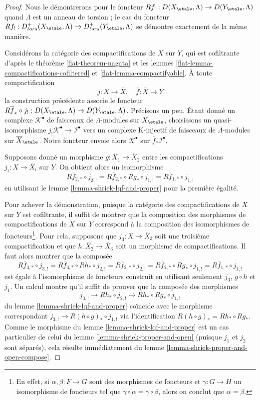 \begin{proof}
Nous le démontrerons pour le foncteur
$Rf_! : D(X_\etale, \Lambda) \to D(Y_\etale, \Lambda)$
quand $\Lambda$ est un anneau de torsion ; le cas du foncteur
$Rf_! : D^+_{tors}(X_\etale, \Lambda) \to D^+_{tors}(Y_\etale, \Lambda)$
se démontre exactement de la même manière.

\medskip\noindent
Considérons la catégorie des compactifications de $X$ sur $Y$, qui est
cofiltrante d'après le théorème \ref{flat-theorem-nagata} et les
lemmes \ref{flat-lemma-compactifications-cofiltered} et
\ref{flat-lemma-compactifyable}.
À toute compactification
$$
j : X \to \overline{X},\quad \overline{f} : \overline{X} \to Y
$$
la construction précédente associe le foncteur $R\overline{f}_* \circ j_! :
D(X_\etale, \Lambda) \to D(Y_\etale, \Lambda)$.
Précisons un peu. Étant donné un complexe $\mathcal{K}^\bullet$
de faisceaux de $\Lambda$-modules sur $X_\etale$, choisissons un quasi-isomorphisme
$j_!\mathcal{K}^\bullet \to \mathcal{I}^\bullet$ vers un complexe K-injectif
de faisceaux de $\Lambda$-modules sur $\overline{X}_\etale$.
Notre foncteur envoie alors $\mathcal{K}^\bullet$ sur
$\overline{f}_*\mathcal{I}^\bullet$.

\medskip\noindent
Supposons donné un morphisme $g : \overline{X}_1 \to \overline{X}_2$
entre les compactifications $j_i : X \to \overline{X}_i$ sur $Y$.
On obtient alors un isomorphisme
$$
R\overline{f}_{2, *} \circ j_{2, !} =
R\overline{f}_{2, *} \circ Rg_* \circ j_{1, !} =
R\overline{f}_{1, *} \circ j_{1, !}
$$
en utilisant le lemme \ref{lemma-shriek-lqf-and-proper} pour la première égalité.

\medskip\noindent
Pour achever la démonstration, puisque la catégorie des compactifications de $X$ sur $Y$
est cofiltrante, il suffit de montrer que la composition des morphismes de
compactifications de $X$ sur $Y$ correspond à la composition
des isomorphismes de foncteurs\footnote{En effet, si $\alpha, \beta : F \to G$
sont des morphismes de foncteurs et $\gamma : G \to H$ un isomorphisme
de foncteurs tel que $\gamma \circ \alpha = \gamma \circ \beta$, alors
on conclut que $\alpha = \beta$.}. Pour cela, supposons que
$j_3 : X \to \overline{X}_3$
soit une troisième compactification et que $h : \overline{X}_2 \to \overline{X}_3$
soit un morphisme de compactifications. Il faut alors montrer que la
composée
$$
R\overline{f}_{3, *} \circ j_{3, !} =
R\overline{f}_{3, *} \circ Rh_* \circ j_{2, !} =
R\overline{f}_{2, *} \circ j_{2, !} =
R\overline{f}_{2, *} \circ Rg_* \circ j_{1, !} =
R\overline{f}_{1, *} \circ j_{1, !}
$$
est égale à l'isomorphisme de foncteurs construit en utilisant seulement
$j_3$, $g \circ h$ et $j_1$. Un calcul montre qu'il suffit de
prouver que la composée des morphismes
$$
j_{3, !} \to Rh_* \circ j_{2, !} \to Rh_* \circ Rg_* \circ j_{1, !}
$$
du lemme \ref{lemma-shriek-lqf-and-proper} coïncide avec le morphisme correspondant
$j_{3, !} \to R(h \circ g)_* \circ j_{1, !}$
via l'identification $R(h \circ g)_* = Rh_* \circ Rg_*$.
Comme le morphisme du lemme \ref{lemma-shriek-lqf-and-proper}
est un cas particulier de celui du lemme \ref{lemma-shriek-proper-and-open}
(puisque $j_1$ et $j_2$ sont séparés), cela résulte immédiatement du
lemme \ref{lemma-shriek-proper-and-open-compose}.
\end{proof}

